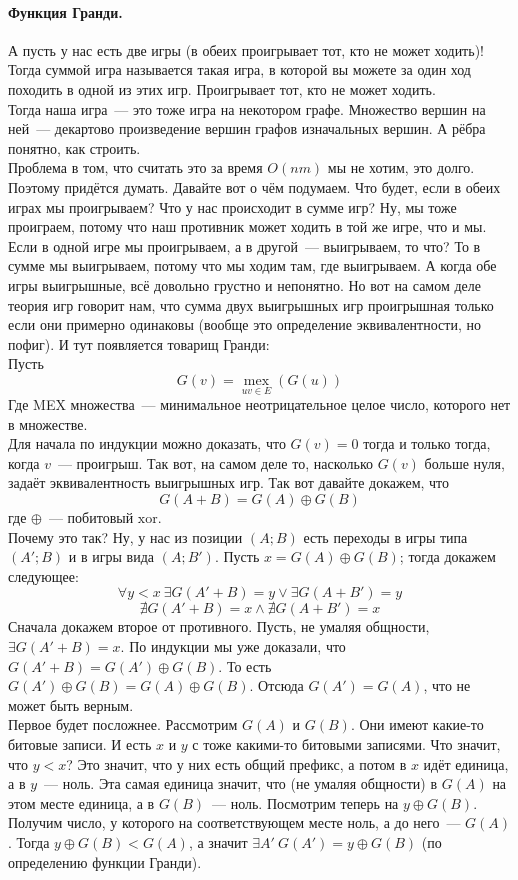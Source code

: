\documentclass{article}
\begin{document}
    \paragraph{Функция Гранди.}
    А пусть у нас есть две игры (в обеих проигрывает тот, кто не может ходить)! Тогда суммой игра называется такая игра, в которой вы можете за один ход походить в одной из этих игр. Проигрывает тот, кто не может ходить.\\
    Тогда наша игра~--- это тоже игра на некотором графе. Множество вершин на ней~--- декартово произведение вершин графов изначальных вершин. А рёбра понятно, как строить.\\
    Проблема в том, что считать это за время $O(nm)$ мы не хотим, это долго. Поэтому придётся думать. Давайте вот о чём подумаем. Что будет, если в обеих играх мы проигрываем? Что у нас происходит в сумме игр? Ну, мы тоже проиграем, потому что наш противник может ходить в той же игре, что и мы. Если в одной игре мы проигрываем, а в другой~--- выигрываем, то что? То в сумме мы выигрываем, потому что мы ходим там, где выигрываем. А когда обе игры выигрышные, всё довольно грустно и непонятно. Но вот на самом деле теория игр говорит нам, что сумма двух выигрышных игр проигрышная только если они примерно одинаковы (вообще это определение эквивалентности, но пофиг). И тут появляется товарищ Гранди:\\
    Пусть
    $$G(v)=\operatorname*{mex}_{uv\in E}(G(u))$$
    Где MEX множества~--- минимальное неотрицательное целое число, которого нет в множестве.\\
    Для начала по индукции можно доказать, что $G(v)=0$ тогда и только тогда, когда $v$~--- проигрыш. Так вот, на самом деле то, насколько $G(v)$ больше нуля, задаёт эквивалентность выигрышных игр. Так вот давайте докажем, что
    $$
    G(A+B)=G(A)\oplus G(B)
    $$
    где $\oplus$~--- побитовый $\mathrm{xor}$.\\
    Почему это так? Ну, у нас из позиции $(A;B)$ есть переходы в игры типа $(A';B)$ и в игры вида $(A;B')$. Пусть $x=G(A)\oplus G(B)$; тогда докажем следующее:
    $$\forall y<x~\exists G(A'+B)=y\lor\exists G(A+B')=y$$
    $$
    \nexists G(A'+B)=x\land\nexists G(A+B')=x
    $$
    Сначала докажем второе от противного. Пусть, не умаляя общности, $\exists G(A'+B)=x$. По индукции мы уже доказали, что $G(A'+B)=G(A')\oplus G(B)$. То есть $G(A')\oplus G(B)=G(A)\oplus G(B)$. Отсюда $G(A')=G(A)$, что не может быть верным.\\
    Первое будет посложнее. Рассмотрим $G(A)$ и $G(B)$. Они имеют какие-то битовые записи. И есть $x$ и $y$ с тоже какими-то битовыми записями. Что значит, что $y<x$? Это значит, что у них есть общий префикс, а потом в $x$ идёт единица, а в $y$~--- ноль. Эта самая единица значит, что (не умаляя общности) в $G(A)$ на этом месте единица, а в $G(B)$~--- ноль. Посмотрим теперь на $y\oplus G(B)$. Получим число, у которого на соответствующем месте ноль, а до него~--- $G(A)$. Тогда $y\oplus G(B)<G(A)$, а значит $\exists A'~G(A')=y\oplus G(B)$ (по определению функции Гранди).\\
\end{document}
